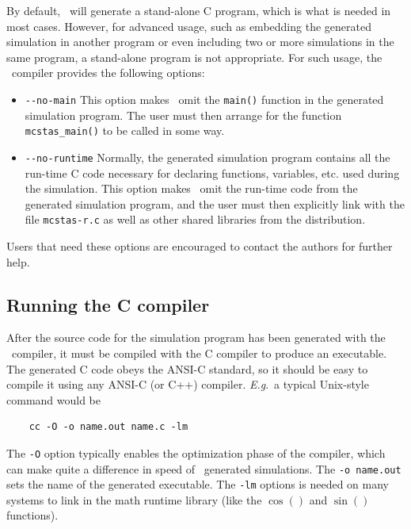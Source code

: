 By default, \MCS\ will generate a stand-alone C program, which is what
is needed in most cases. However, for advanced usage, such as embedding
the generated simulation in another program or even including two or
more simulations in the same program, a stand-alone program is not
appropriate. For such usage, the \MCS\ compiler provides the following
options:
\begin{itemize}
\item \verb+--no-main+ This option makes \MCS\ omit the \verb+main()+
  function in the generated simulation program. The user must then
  arrange for the function \verb+mcstas_main()+ to be called in some
  way.
\item \verb+--no-runtime+ Normally, the
  generated simulation program contains all the run-time C code necessary for
  declaring functions, variables, etc. used during the simulation.  This
  option makes \MCS\ omit the run-time code from the generated
  simulation program, and the user must then explicitly link with the file
  \verb+mcstas-r.c+ as well as other shared libraries from the \MCS{} distribution. 
\end{itemize}
Users that need these options are encouraged to contact the authors for
further help.


\subsection{Running the C compiler}
\label{s:compile}

After the source code for the simulation program has been generated with
the \MCS\ compiler, it must be compiled with the C compiler to produce
an executable. The generated C code obeys the ANSI-C standard, so it
should be easy to compile it using any ANSI-C (or C++) compiler. \textit{E.g}.\ a
typical Unix-style command would be
\begin{verbatim}
    cc -O -o name.out name.c -lm
\end{verbatim}
The \verb+-O+ option typically enables the optimization phase of the compiler,
which can make quite a difference in speed of \MCS\ generated simulations. The
\verb+-o name.out+ sets the name of the generated executable. The \verb+-lm+
options is needed on many systems to link in the math runtime library (like the
$\cos()$ and $\sin()$ functions). 

